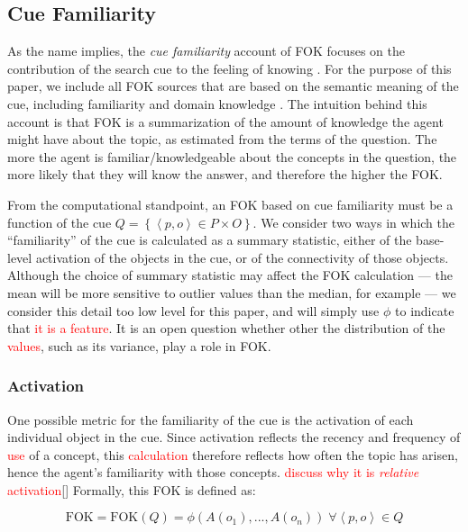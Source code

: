 \documentclass[10pt,letterpaper]{article}
\newcommand{\fixme}[2][]{#2}
\renewcommand{\fixme}[2][]{\textcolor{red}{#2}}
\newcommand{\setof}[1]{\left \{ #1 \right \}}
\newcommand{\tuple}[1]{\left \langle #1 \right \rangle }
\newcommand{\fok}[0]{\text{FOK}}
\begin{document}
\subsection{Cue Familiarity}

As the name implies, the \emph{cue familiarity} account of FOK focuses on the contribution of the search cue to the feeling of knowing \cite{Reder1992WhatDeterminesInitial,Metcalfe1993TheCueFamiliarity,Koriat2001TheCombinedContributions}.
For the purpose of this paper, we include all FOK sources that are based on the semantic meaning of the cue, including familiarity and domain knowledge \cite{Schwartz1994SourcesOfInformation}.
The intuition behind this account is that FOK is a summarization of the amount of knowledge the agent might have about the topic, as estimated from the terms of the question.
The more the agent is familiar/knowledgeable about the concepts in the question, the more likely that they will know the answer, and therefore the higher the FOK.

From the computational standpoint, an FOK based on cue familiarity must be a function of the cue $Q = \setof{\tuple{p, o}{\in}P{\times}O}$.
We consider two ways in which the ``familiarity'' of the cue is calculated as a summary statistic, either of the base-level activation of the objects in the cue, or of the connectivity of those objects.
Although the choice of summary statistic may affect the FOK calculation --- the mean will be more sensitive to outlier values than the median, for example --- we consider this detail too low level for this paper, and will simply use $\phi$ to indicate that \fixme{it is a feature}.
It is an open question whether other the distribution of the \fixme{values}, such as its variance, play a role in FOK.

\subsubsection{Activation}

One possible metric for the familiarity of the cue is the activation of each individual object in the cue.
Since activation reflects the recency and frequency of \fixme{use} of a concept, this \fixme{calculation} therefore reflects how often the topic has arisen, hence the agent's familiarity with those concepts.
\fixme{discuss why it is \emph{relative} activation}[]
Formally, this FOK is defined as:

$$\fok = \fok(Q) = \phi\left(A(o_1), ..., A(o_n)\right) \; \forall {\tuple{p, o}{\in}Q}$$
\end{document}
